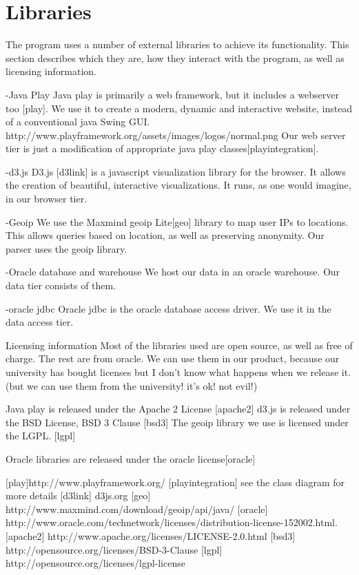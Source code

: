 \section{Libraries}

The program uses a number of external libraries to achieve its functionality. This section describes which they are,
how they interact with the program, as well as licensing information. 

-Java Play
Java play is primarily a web framework, but it includes a webserver too [play].
We use it to create a modern, dynamic and interactive website, instead of a conventional java Swing GUI.
http://www.playframework.org/assets/images/logos/normal.png
Our web server tier is just a modification of appropriate java play classes[playintegration].

-d3.js
D3.js [d3link] is a javascript visualization library for the browser.
It allows the creation of beautiful, interactive visualizations.
It runs, as one would imagine, in our browser tier.

-Geoip
We use the Maxmind geoip Lite[geo] library to map user IPs to locations.
This allows queries based on location, as well as preserving anonymity.
Our parser uses the geoip library.

-Oracle database and warehouse
We host our data in an oracle warehouse.
Our data tier consists of them.

-oracle jdbc
Oracle jdbc is the oracle database access driver. We use it in the data access tier.



Licensing information
Most of the libraries used are open source, as well as free of charge.
The rest are from oracle. We can use them in our product, because our university has bought licenses but I don't know what happens when we release it.
(but we can use them from the university! it's ok! not evil!)

Java play is released under the Apache 2 License [apache2]
d3.js is released under the BSD License, BSD 3 Clause [bsd3]
The geoip library we use is licensed under the LGPL. [lgpl]

Oracle libraries are released under the oracle license[oracle]



[play]http://www.playframework.org/
[playintegration] see the class diagram for more details
[d3link] d3js.org
[geo] http://www.maxmind.com/download/geoip/api/java/
[oracle] http://www.oracle.com/technetwork/licenses/distribution-license-152002.html.
[apache2] http://www.apache.org/licenses/LICENSE-2.0.html
[bsd3]  http://opensource.org/licenses/BSD-3-Clause
[lgpl] http://opensource.org/licenses/lgpl-license
